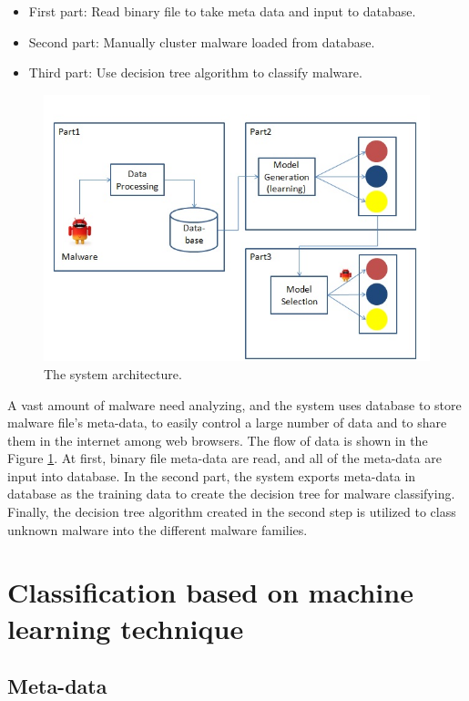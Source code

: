 \begin{itemize}
\item First part: Read binary file to take meta data and input to database.
\item Second part: Manually cluster malware loaded from database.
\item Third part: Use decision tree algorithm to classify malware.
\end{itemize}
\begin{figure}[h!]
\centering
\includegraphics[width=1\textwidth]
{graph/system_architec.jpg}
\caption{The system architecture.}
\label{fig:system_architec}
\end{figure}

A vast amount of malware need analyzing, and the system uses database to store malware file's meta-data, to easily control a large number of data and to share them in the internet among web browsers.
The flow of data is shown in the Figure \ref{fig:system_architec}. At first, binary file meta-data are read, and all of the meta-data are input into database. In the second part, the system exports meta-data in database as the training data to create the decision tree for malware classifying. Finally, the decision tree algorithm created in the second step is utilized to class  unknown malware into the different malware families. 
%
%
\section{Classification based on machine learning technique} 
\subsection{Meta-data}

